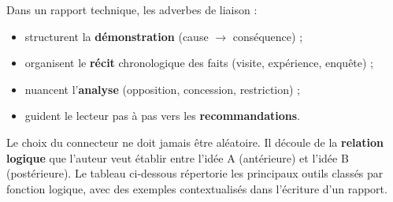 \documentclass[11pt]{article}
\begin{document}
\begin{aretenir}
Dans un rapport technique, les adverbes de liaison :
\begin{itemize}
    \item structurent la \textbf{démonstration} (cause $\rightarrow$ conséquence) ;
    \item organisent le \textbf{récit} chronologique des faits (visite, expérience, enquête) ;
    \item nuancent l'\textbf{analyse} (opposition, concession, restriction) ;
    \item guident le lecteur pas à pas vers les \textbf{recommandations}.
\end{itemize}
\end{aretenir}

Le choix du connecteur ne doit jamais être aléatoire. Il découle de la \textbf{relation logique} que l'auteur veut établir entre l'idée A (antérieure) et l'idée B (postérieure). Le tableau ci-dessous répertorie les principaux outils classés par fonction logique, avec des exemples contextualisés dans l'écriture d'un rapport.
\end{document}
